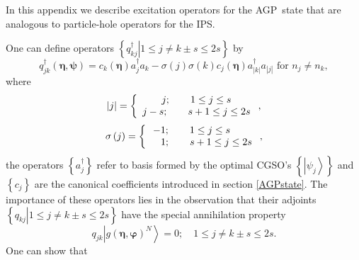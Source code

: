 \documentclass[aps,preprint]{revtex4}%
\begin{document}
In this appendix we describe excitation operators for the AGP\ state that are
analogous to particle-hole operators for the IPS.

One can define operators $\left\{  \left.  q_{kj}^{\dagger}\right\vert 1\leq
j\neq k\pm s\leq2s\right\}  $ by
\begin{equation}
q_{jk}^{\dagger}\left(  \bm{\eta,\psi}\right)  =c_{k}\left(
\bm{\eta }\right)  a_{j}^{\dagger}a_{k}-\sigma\left(  j\right)  \sigma\left(
k\right)  c_{j}\left(  \bm{\eta}\right)  a_{\left\vert k\right\vert }%
^{\dagger}a_{\left\vert j\right\vert }\text{ for }n_{j}\neq n_{k},
\end{equation}
where%
\begin{equation}
\left\vert j\right\vert =\left\{
\begin{array}
[c]{c}%
j;\qquad1\leq j\leq s\\
j-s;\qquad s+1\leq j\leq2s
\end{array}
\right.  ,
\end{equation}%
\begin{equation}
\sigma\left(  j\right)  =\left\{
\begin{array}
[c]{c}%
-1;\qquad1\leq j\leq s\quad\quad\\
\quad1;\qquad s+1\leq j\leq2s
\end{array}
\right.  ,
\end{equation}
the operators $\left\{  a_{j}^{\dagger}\right\}  $ refer to basis formed by
the optimal CGSO's $\left\{  \left\vert \psi_{j}\right\rangle \right\}  $ and
$\left\{  c_{j}\right\}  $ are the canonical coefficients introduced in
section \ref{AGPstate}. The importance of these operators lies in the
observation that their adjoints $\left\{  \left.  q_{kj}\right\vert 1\leq
j\neq k\pm s\leq2s\right\}  $ have the special annihilation property%
\begin{equation}
q_{jk}\left\vert g\left(  \bm{\eta},\bm{\varphi}\right)  ^{N}\right\rangle
=0;\quad1\leq j\neq k\pm s\leq2s.
\end{equation}
One can show \cite{Goscinski82a} that
\end{document}
